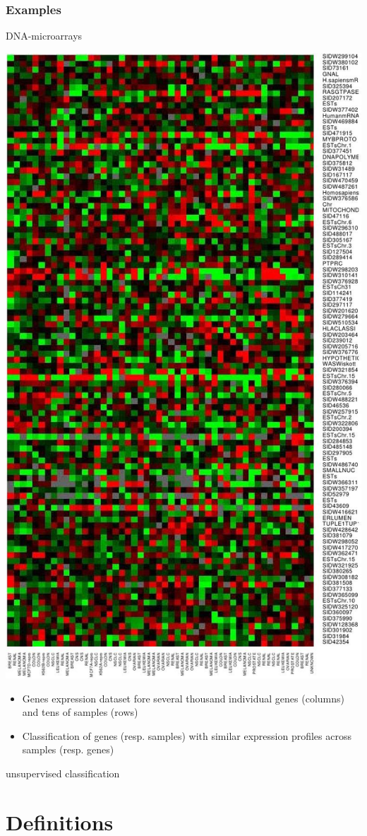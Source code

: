 \documentclass[compress, smaller, serif, 9pt]{beamer}
\newcommand{\structuretext}[1]{{\usebeamercolor[fg]{structure} #1}}
\newcommand{\doigt}{\structuretext{\noindent \Pisymbol{pzd}{43}}}
\begin{document}
\begin{frame}
  \frametitle{Examples}
\begin{block}{DNA-microarrays}
\begin{center}
  \includegraphics[angle=90, origin=c, width=.6\textwidth]{ex_biopuce.jpg}
\end{center}
\vspace{-20mm}
\begin{itemize}
\item Genes expression dataset fore several thousand individual genes (columns) and tens of samples  (rows)
\item[\doigt] Classification of genes (resp. samples)  with similar expression profiles across samples (resp. genes)
\end{itemize}
\end{block}
\begin{center}
 \alert{unsupervised classification}
\end{center}
\end{frame}

\section{Definitions}
\end{document}
